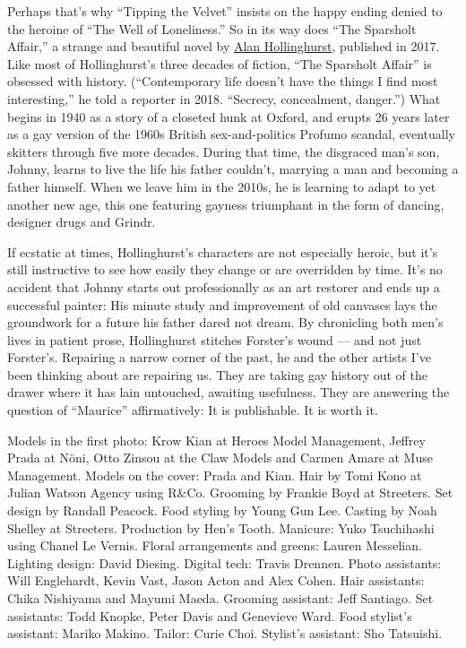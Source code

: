 Perhaps that's why ``Tipping the Velvet'' insists on the happy ending
denied to the heroine of ``The Well of Loneliness.'' So in its way does
``The Sparsholt Affair,'' a strange and beautiful novel by
\href{https://www.nytimes3xbfgragh.onion/2015/10/09/t-magazine/my-10-favorite-books-alan-hollinghurst.html}{Alan
Hollinghurst}, published in 2017. Like most of Hollinghurst's three
decades of fiction, ``The Sparsholt Affair'' is obsessed with history.
(``Contemporary life doesn't have the things I find most interesting,''
he told a reporter in 2018. ``Secrecy, concealment, danger.'') What
begins in 1940 as a story of a closeted hunk at Oxford, and erupts 26
years later as a gay version of the 1960s British sex-and-politics
Profumo scandal, eventually skitters through five more decades. During
that time, the disgraced man's son, Johnny, learns to live the life his
father couldn't, marrying a man and becoming a father himself. When we
leave him in the 2010s, he is learning to adapt to yet another new age,
this one featuring gayness triumphant in the form of dancing, designer
drugs and Grindr.

If ecstatic at times, Hollinghurst's characters are not especially
heroic, but it's still instructive to see how easily they change or are
overridden by time. It's no accident that Johnny starts out
professionally as an art restorer and ends up a successful painter: His
minute study and improvement of old canvases lays the groundwork for a
future his father dared not dream. By chronicling both men's lives in
patient prose, Hollinghurst stitches Forster's wound --- and not just
Forster's. Repairing a narrow corner of the past, he and the other
artists I've been thinking about are repairing us. They are taking gay
history out of the drawer where it has lain untouched, awaiting
usefulness. They are answering the question of ``Maurice''
affirmatively: It is publishable. It is worth it.

Models in the first photo: Krow Kian at Heroes Model Management, Jeffrey
Prada at Nöni, Otto Zinsou at the Claw Models and Carmen Amare at Muse
Management. Models on the cover: Prada and Kian. Hair by Tomi Kono at
Julian Watson Agency using R\&Co. Grooming by Frankie Boyd at Streeters.
Set design by Randall Peacock. Food styling by Young Gun Lee. Casting by
Noah Shelley at Streeters. Production by Hen's Tooth. Manicure: Yuko
Tsuchihashi using Chanel Le Vernis. Floral arrangements and greens:
Lauren Messelian. Lighting design: David Diesing. Digital tech: Travis
Drennen. Photo assistants: Will Englehardt, Kevin Vast, Jason Acton and
Alex Cohen. Hair assistants: Chika Nishiyama and Mayumi Maeda. Grooming
assistant: Jeff Santiago. Set assistants: Todd Knopke, Peter Davis and
Genevieve Ward. Food stylist's assistant: Mariko Makino. Tailor: Curie
Choi. Stylist's assistant: Sho Tatsuishi.

